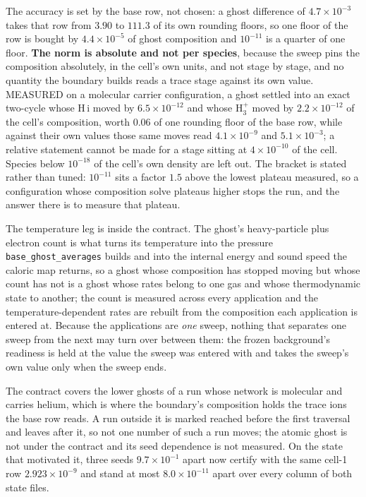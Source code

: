 \documentclass[english,a4paper]{my_memo}
\begin{document}
The accuracy is set by the base row, not chosen: a ghost difference of
$4.7\times10^{-3}$ takes that row from $3.90$ to $111.3$ of its own rounding
floors, so one floor of the row is bought by $4.4\times10^{-5}$ of ghost
composition and $10^{-11}$ is a quarter of one floor. \textbf{The norm is
absolute and not per species}, because the sweep pins the composition
absolutely, in the cell's own units, and not stage by stage, and no quantity
the boundary builds reads a trace stage against its own value. MEASURED on a
molecular carrier configuration, a ghost settled into an exact two-cycle
whose H\,{\sc i} moved by $6.5\times10^{-12}$ and whose H$_3^+$ moved by
$2.2\times10^{-12}$ of the cell's composition, worth $0.06$ of one rounding
floor of the base row, while against their own values those same moves read
$4.1\times10^{-9}$ and $5.1\times10^{-3}$; a relative statement cannot be
made for a stage sitting at $4\times10^{-10}$ of the cell. Species below
$10^{-18}$ of the cell's own density are left out. The bracket is stated
rather than tuned: $10^{-11}$ sits a factor $1.5$ above the lowest plateau
measured, so a configuration whose composition solve plateaus higher stops
the run, and the answer there is to measure that plateau.

The temperature leg is inside the contract. The ghost's heavy-particle plus
electron count is what turns its temperature into the pressure
\texttt{base\_ghost\_averages} builds and into the internal energy and sound
speed the caloric map returns, so a ghost whose composition has stopped
moving but whose count has not is a ghost whose rates belong to one gas and
whose thermodynamic state to another; the count is measured across every
application and the temperature-dependent rates are rebuilt from the
composition each application is entered at. Because the applications are
\emph{one} sweep, nothing that separates one sweep from the next may turn
over between them: the frozen background's readiness is held at the value the
sweep was entered with and takes the sweep's own value only when the sweep
ends.

The contract covers the lower ghosts of a run whose network is molecular and
carries helium, which is where the boundary's composition holds the trace
ions the base row reads. A run outside it is marked reached before the first
traversal and leaves after it, so not one number of such a run moves; the
atomic ghost is not under the contract and its seed dependence is not
measured. On the state that motivated it, three seeds $9.7\times10^{-1}$
apart now certify with the same cell-1 row $2.923\times10^{-9}$ and stand at
most $8.0\times10^{-11}$ apart over every column of both state files.
\end{document}
